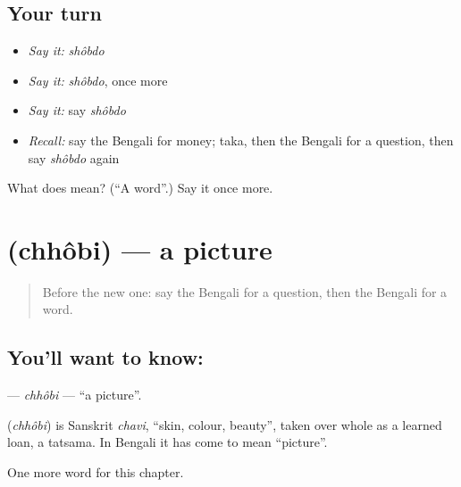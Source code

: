 \subsection*{Your turn}
\begin{itemize}
\raggedright
  \item \emph{Say it:} \emph{shôbdo}
  \item \emph{Say it:} \emph{shôbdo}, once more
  \item \emph{Say it:} say \emph{shôbdo}
  \item \emph{Recall:} say the Bengali for money; taka, then the Bengali for a question, then say \emph{shôbdo} again
\end{itemize}

\begin{tcolorbox}[breakable,colback=teal!4,colframe=teal!35!black,title={Before you move on}]
What does  mean? (\textquotedblleft{}A word\textquotedblright{}.) Say it once more.
\end{tcolorbox}
\section[\texorpdfstring{\bn{ছবি} (chhôbi)}{ছবি (chhôbi)}]{ (chhôbi) — a picture}

\label{lesson:BN-C65-chhobi}



\begin{quote}
Before the new one: say the Bengali for a question, then the Bengali for a word.
\end{quote}

\subsection*{You'll want to know: }
\textbf{} — \emph{chhôbi} — \textquotedblleft{}a picture\textquotedblright{}.

\begin{cousinweb}
\textbf{} (\emph{chhôbi}) is Sanskrit \emph{chavi}, \textquotedblleft{}skin, colour, beauty\textquotedblright{}, taken over whole as a learned loan, a tatsama. In Bengali it has come to mean \textquotedblleft{}picture\textquotedblright{}.
\end{cousinweb}

\begin{grammarlens}[title={What you've built}]
One more word for this chapter.
\end{grammarlens}

